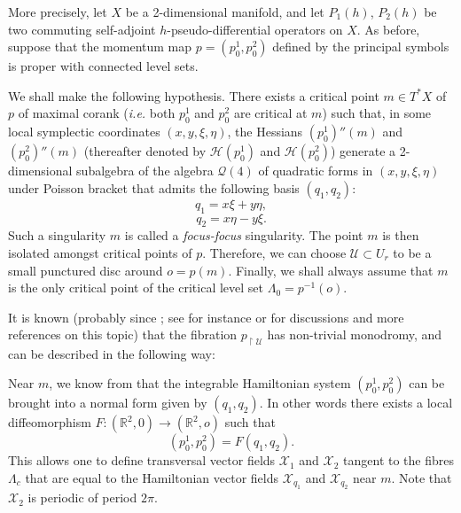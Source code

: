 \documentclass[cmp]{svjour}  %
\newcommand{\ham}[1]{\mathcal{X}_{#1}}
\newcommand{\fleche}{\rightarrow}
\newcommand{\restr}{\upharpoonright}
\newcommand{\pdo}{pseudo-differential operator}
\newcommand{\RM}{\mathbb{R}}
\newcommand{\U}{\mathcal{U}}
\begin{document}
More precisely, let $X$ be a 2-dimensional manifold, and let $P_1(h)$,
$P_2(h)$ be two commuting self-adjoint $h$-\pdo s on $X$. As before,
suppose that the momentum map $p=(p_0^1,p_0^2)$ defined by the
principal symbols is proper with connected level sets.

We shall make the following hypothesis. There exists a critical point
$m\in T^*X$ of $p$ of maximal corank (\emph{i.e.} both $p_0^1$ and
$p_0^2$ are critical at $m$) such that, in some local symplectic
coordinates $(x,y,\xi,\eta)$, the Hessians $(p_0^1)''(m)$ and
$(p_0^2)''(m)$ (thereafter denoted by $\mathcal{H}(p_0^1)$ and
$\mathcal{H}(p_0^2)$) generate a 2-dimensional subalgebra of the
algebra $\mathcal{Q}(4)$ of quadratic forms in $(x,y,\xi,\eta)$ under
Poisson bracket that admits the following basis $(q_1,q_2)$:
\[ q_1 = x\xi + y\eta,\]
\[ q_2 = x\eta - y\xi.\]
Such a singularity $m$ is called a \emph{focus-focus} singularity. The
point $m$ is then isolated amongst critical points of $p$. Therefore,
we can choose $\U\subset U_r$ to be a small punctured disc around
$o=p(m)$. Finally, we shall always assume that $m$ is the only
critical point of the critical level set $\Lambda_0=p^{-1}(o)$.

It is known (probably since \cite{zou}; see for instance \cite{san2}
or \cite{cushman-duist2} for discussions and more references on this
topic) that the fibration $p_{\restr \U}$ has non-trivial monodromy,
and can be described in the following way:

Near $m$, we know from \cite{eliasson-these} that the integrable
Hamiltonian system $(p_0^1,p_0^2)$ can be brought into a normal form
given by $(q_1,q_2)$. In other words there exists a local
diffeomorphism $F:(\RM^2,0)\fleche (\RM^2,o)$ such that
\[ (p_0^1,p_0^2) = F(q_1,q_2).\]
This allows one to define transversal vector fields $\ham{1}$ and
$\ham{2}$ tangent to the fibres $\Lambda_c$ that are equal to
the Hamiltonian vector fields $\ham{q_1}$ and $\ham{q_2}$ near
$m$. Note that $\ham{2}$ is periodic of period $2\pi$.
\end{document}
